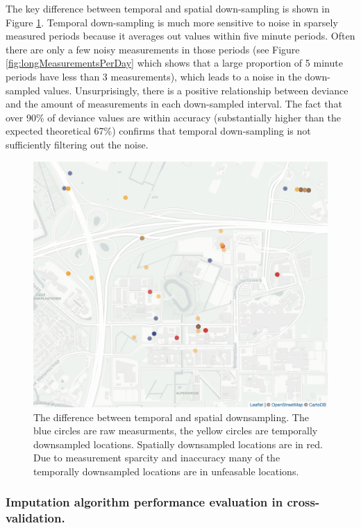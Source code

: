 \documentclass[man]{apa6}
\theoremstyle{definition}
\theoremstyle{definition}
\theoremstyle{definition}
\theoremstyle{remark}
\begin{document}
The key difference between temporal and spatial down-sampling is shown
in Figure \ref{fig:palmiusVsMe1}. Temporal down-sampling is much more
sensitive to noise in sparsely measured periods because it averages out
values within five minute periods. Often there are only a few noisy
measurements in those periods (see Figure
\ref{fig:longMeasurementsPerDay} which shows that a large proportion of
5 minute periods have less than 3 measurements), which leads to a noise
in the down-sampled values. Unsurprisingly, there is a positive
relationship between deviance and the amount of measurements in each
down-sampled interval. The fact that over 90\% of deviance values are
within accuracy (substantially higher than the expected theoretical
67\%) confirms that temporal down-sampling is not sufficiently filtering
out the noise.

\begin{figure}
\includegraphics[width=1\linewidth]{img/tempVsspace} \caption{The difference between temporal and spatial downsampling. The blue circles are raw measurments, the yellow circles are temporally downsampled locations. Spatially downsampled locations are in red. Due to measurement sparcity and inaccuracy many of the temporally downsampled locations are in unfeasable locations.}\label{fig:palmiusVsMe1}
\end{figure}

\subsubsection{Imputation algorithm performance evaluation in
cross-validation.}\label{imputation-algorithm-performance-evaluation-in-cross-validation.}
\end{document}
